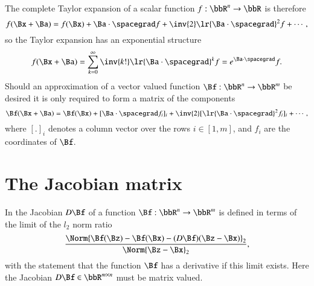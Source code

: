 %
The complete Taylor expansion of a scalar function \( f : \bbR^n \rightarrow \bbR \) is therefore
%
\begin{equation}\label{eqn:jacobianAndHessian:120}
f(\Bx + \Ba)
= f(\Bx) +
\Ba \cdot \spacegrad f +
\inv{2} \lr{ \Ba \cdot \spacegrad}^2 f + \cdots,
\end{equation}
%
so the Taylor expansion has an exponential structure
%
\begin{equation}\label{eqn:jacobianAndHessian:140}
f(\Bx + \Ba) = \sum_{k = 0}^\infty \inv{k!} \lr{ \Ba \cdot \spacegrad}^k f = e^{\Ba \cdot \spacegrad} f.
\end{equation}
%
Should an approximation of a vector valued function \( \Bf : \bbR^n \rightarrow \bbR^m \) be desired it is only required to form a matrix of the components
%
\begin{equation}\label{eqn:jacobianAndHessian:160}
\Bf(\Bx + \Ba)
= \Bf(\Bx) +
[\Ba \cdot \spacegrad f_i]_i +
\inv{2} [\lr{ \Ba \cdot \spacegrad}^2 f_i]_i + \cdots,
\end{equation}
%
where \( [.]_i \) denotes a column vector over the rows \( i \in [1,m] \), and \( f_i \) are the coordinates of \( \Bf \).

\section{The Jacobian matrix}

In \citep{boyd2004convex} the Jacobian \( D \Bf \) of a function \( \Bf : \bbR^n \rightarrow \bbR^m \) is defined in terms of the limit of the \( l_2 \) norm ratio
%
\begin{equation}\label{eqn:jacobianAndHessian:180}
\frac{\Norm{\Bf(\Bz) - \Bf(\Bx) - (D \Bf) (\Bz - \Bx)}_2 }{ \Norm{\Bz - \Bx}_2 },
\end{equation}
%
with the statement that the function \( \Bf \) has a derivative if this limit exists.  Here the Jacobian \( D \Bf \in \bbR^{m \times n} \) must be matrix valued.

